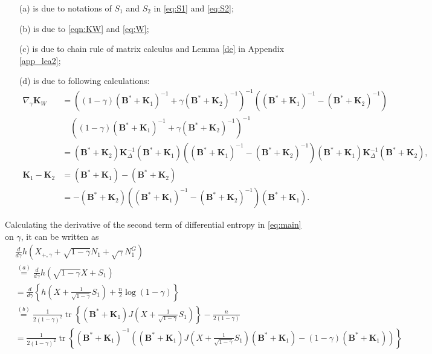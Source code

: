 \documentclass[journal,final, onecolumn]{IEEEtran}
\DeclareMathOperator{\tr}{tr}
\begin{document}
\begin{enumerate}
\item [(a)] is due to notations of $S_1$ and $S_2$ in \eqref{eq:S1} and \eqref{eq:S2};
\item[(b)] is due to \eqref{eqn:KW} and \eqref{eq:W};
\item[(c)] is due to chain rule of matrix calculus and Lemma \ref{de} in Appendix \ref{app_lea2};
\item[(d)] is due to following calculations:
  \begin{align}
   \nabla_\gamma \boldsymbol{K}_{W}  &= \left(   {(1-\gamma)}(\boldsymbol{B}^{*} + \boldsymbol{K}_{1})^{-1} +  \gamma (\boldsymbol{B}^{*} + \boldsymbol{K}_{2})^{-1}           \right)^{-1}\left(     (\boldsymbol{B}^{*} + \boldsymbol{K}_{1})^{-1} - (\boldsymbol{B}^{*} + \boldsymbol{K}_{2})^{-1}            \right) \nonumber \\
   &\quad \left(   {(1-\gamma)}(\boldsymbol{B}^{*} + \boldsymbol{K}_{1})^{-1} +  \gamma (\boldsymbol{B}^{*} + \boldsymbol{K}_{2})^{-1}           \right)^{-1} \nonumber \\
   &= (\boldsymbol{B}^{*} + \boldsymbol{K}_{2}) \boldsymbol{K}^{-1}_{\Delta}(\boldsymbol{B}^{*} + \boldsymbol{K}_{1})\left(     (\boldsymbol{B}^{*} + \boldsymbol{K}_{1})^{-1} - (\boldsymbol{B}^{*} + \boldsymbol{K}_{2})^{-1}  \right)(\boldsymbol{B}^{*} + \boldsymbol{K}_{1}) \boldsymbol{K}^{-1}_{\Delta}(\boldsymbol{B}^{*} + \boldsymbol{K}_{2}), \\
  \boldsymbol{K}_{1} - \boldsymbol{K}_{2}&= (\boldsymbol{B}^{*} + \boldsymbol{K}_{1}) - (\boldsymbol{B}^{*} + \boldsymbol{K}_{2})\nonumber \\
  &=-(\boldsymbol{B}^{*} + \boldsymbol{K}_{2})\left(     (\boldsymbol{B}^{*} + \boldsymbol{K}_{1})^{-1} - (\boldsymbol{B}^{*} + \boldsymbol{K}_{2})^{-1}  \right)(\boldsymbol{B}^{*} + \boldsymbol{K}_{1}).\label{eq:dev2}
  \end{align}
\end{enumerate}
Calculating the derivative of the second term of differential entropy in \eqref{eq:main} on $\gamma$, it can be written as
\begin{align}
&\frac{d}{d\gamma}h\left(X_{+,\gamma}+\sqrt{1-\gamma}N_{1} + \sqrt{\gamma} N^{G}_{1}\right)\nonumber \\
&\overset{(a)}=\frac{d}{d\gamma} h\left(    \sqrt{1-\gamma}X + S_{1}               \right) \label{eq:ddev2}\\
&=\frac{d}{d\gamma} \left\{  h\left(  X + \frac{1}{\sqrt{1-\gamma}}S_{1}  \right)+\frac{n}{2}\log (1-\gamma)  \right\}  \\
&\overset{(b)} = \frac{1}{2(1-\gamma)^2} \tr \left\{     (\boldsymbol{B}^{*} + \boldsymbol{K}_{1}) J\left( X + \frac{1}{\sqrt{1-\gamma}}S_{1}\right)         \right\} -\frac{n}{2(1-\gamma)} \\
&=\frac{1}{2(1-\gamma)^{2}} \tr \left\{     (\boldsymbol{B}^{*}+\boldsymbol{K}_{1})^{-1} \left( {(\boldsymbol{B}^{*}+\boldsymbol{K}_{1})}        J\left(X+\frac{1}{\sqrt{1-\gamma}}S_{1}\right)  {(\boldsymbol{B}^{*}+\boldsymbol{K}_{1})} - {(1-\gamma)} (\boldsymbol{B}^{*}+\boldsymbol{K}_{1})                    \right)    \right\}\label{eq:ddevv2}
\end{align}
\end{document}
